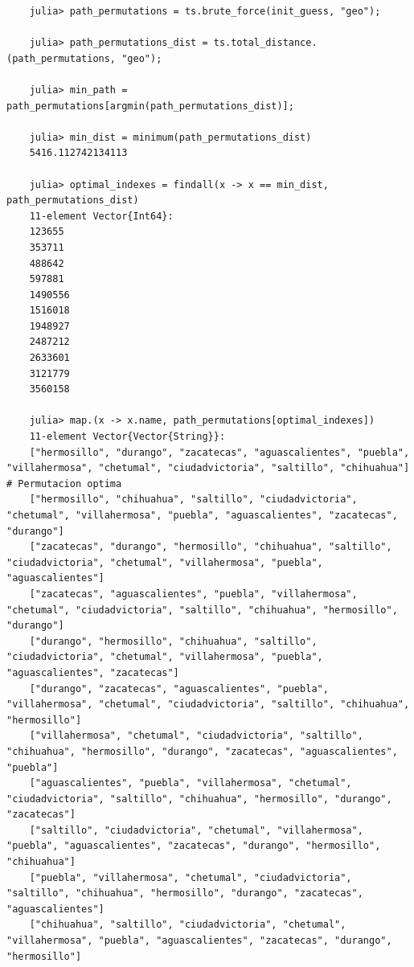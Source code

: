 \begin{verbatim}
    julia> path_permutations = ts.brute_force(init_guess, "geo");

    julia> path_permutations_dist = ts.total_distance.(path_permutations, "geo");

    julia> min_path = path_permutations[argmin(path_permutations_dist)];

    julia> min_dist = minimum(path_permutations_dist)
    5416.112742134113

    julia> optimal_indexes = findall(x -> x == min_dist, path_permutations_dist)
    11-element Vector{Int64}:
    123655
    353711
    488642
    597881
    1490556
    1516018
    1948927
    2487212
    2633601
    3121779
    3560158

    julia> map.(x -> x.name, path_permutations[optimal_indexes])
    11-element Vector{Vector{String}}:
    ["hermosillo", "durango", "zacatecas", "aguascalientes", "puebla", "villahermosa", "chetumal", "ciudadvictoria", "saltillo", "chihuahua"]    # Permutacion optima
    ["hermosillo", "chihuahua", "saltillo", "ciudadvictoria", "chetumal", "villahermosa", "puebla", "aguascalientes", "zacatecas", "durango"]
    ["zacatecas", "durango", "hermosillo", "chihuahua", "saltillo", "ciudadvictoria", "chetumal", "villahermosa", "puebla", "aguascalientes"]
    ["zacatecas", "aguascalientes", "puebla", "villahermosa", "chetumal", "ciudadvictoria", "saltillo", "chihuahua", "hermosillo", "durango"]
    ["durango", "hermosillo", "chihuahua", "saltillo", "ciudadvictoria", "chetumal", "villahermosa", "puebla", "aguascalientes", "zacatecas"]
    ["durango", "zacatecas", "aguascalientes", "puebla", "villahermosa", "chetumal", "ciudadvictoria", "saltillo", "chihuahua", "hermosillo"]
    ["villahermosa", "chetumal", "ciudadvictoria", "saltillo", "chihuahua", "hermosillo", "durango", "zacatecas", "aguascalientes", "puebla"]
    ["aguascalientes", "puebla", "villahermosa", "chetumal", "ciudadvictoria", "saltillo", "chihuahua", "hermosillo", "durango", "zacatecas"]
    ["saltillo", "ciudadvictoria", "chetumal", "villahermosa", "puebla", "aguascalientes", "zacatecas", "durango", "hermosillo", "chihuahua"]
    ["puebla", "villahermosa", "chetumal", "ciudadvictoria", "saltillo", "chihuahua", "hermosillo", "durango", "zacatecas", "aguascalientes"]
    ["chihuahua", "saltillo", "ciudadvictoria", "chetumal", "villahermosa", "puebla", "aguascalientes", "zacatecas", "durango", "hermosillo"]
\end{verbatim}

